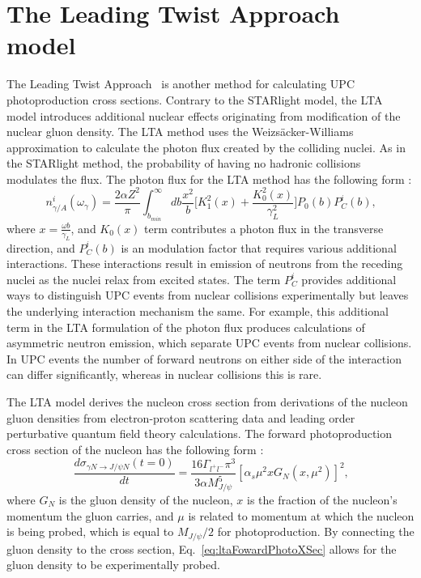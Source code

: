   \section{\label{sec:ltaTheory}The Leading Twist Approach model}
    The Leading Twist Approach~\cite{Frankfurt:2011cs,lta2011.09} is another method for calculating UPC 
      photoproduction cross sections. 
    Contrary to the STARlight model, the LTA model introduces additional 
      nuclear effects originating from modification of the nuclear gluon
      density. 
    The LTA method uses the Weizs\"{a}cker-Williams approximation to calculate 
      the photon flux created by the colliding nuclei. 
    As in the STARlight method, the probability of having no hadronic collisions 
      modulates the flux.
    The photon flux for the LTA method has the following form \cite{lta2011.09}:
    \begin{equation} \label{eq:ltaPhotonFlux}
      n_{\gamma/A}^{i}(\omega_{\gamma})=\frac{2\alpha Z^{2}}{\pi}\int_{b_{min}}^{\infty}
        db\frac{x^{2}}{b}\Big[K_{1}^{2}(x)+\frac{K_{0}^{2}(x)}{\gamma_{L}^{2}}\Big]
        P_{0}(b)P_{C}^{i}(b)\textrm{,} 
    \end{equation}
    where $x=\frac{\omega b}{\gamma_{L}}$, and $K_{0}(x)$ term contributes 
      a photon flux in the transverse direction, and $P_{C}^{i}(b)$ is an 
      modulation factor that requires various additional interactions. 
    These interactions result in emission of neutrons from the 
      receding nuclei as the nuclei relax from excited states. 
    The term $P_{C}^{i}$ provides additional ways to distinguish UPC
      events from nuclear collisions experimentally but leaves the underlying 
      interaction mechanism the same. 
    For example, this additional term in the LTA formulation of the photon flux
      produces calculations of asymmetric neutron emission, which separate UPC 
      events from nuclear collisions.
    In UPC events the number of forward neutrons on either side of the 
      interaction can differ significantly, whereas in nuclear collisions this
      is rare. 

    The LTA model derives the nucleon cross section from derivations
     of the nucleon gluon densities from electron-proton scattering data and
     leading order perturbative quantum field theory calculations.
    The forward photoproduction cross section of the nucleon has the following
     form \cite{lta2011.09}:
   \begin{equation} \label{eq:ltaFowardPhotoXSec}
     \frac{d\sigma_{\gamma N\rightarrow J/\psi N}(t=0)}{dt}=\frac{16\Gamma_{l^{+}l^{-}}\pi^{3}}
     {3\alpha M_{J/\psi}^{5}}[\alpha_{s}\mu^{2}xG_{N}(x,\mu^{2})]^{2}\textrm{,}
   \end{equation}
     where $G_{N}$ is the gluon density of the nucleon, $x$ is the fraction of
     the nucleon's momentum the gluon carries, and $\mu$ is related
     to momentum at which the nucleon is being probed, which is equal to 
     $M_{J/\psi}/2$ for \JPsi{} photoproduction.
   By connecting the gluon density to the cross section, Eq.~\ref{eq:ltaFowardPhotoXSec}
     allows for the gluon density to be experimentally probed. 

